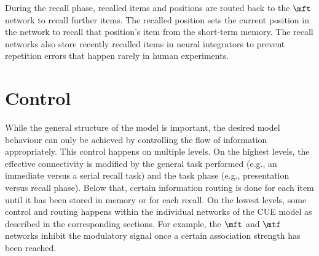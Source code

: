 During the recall phase, recalled items and positions are routed back to the $\mft$ network to recall further items.
The recalled position sets the current position in the  network to recall that position's item from the  short-term memory.
The recall networks also store recently recalled items in neural integrators to prevent repetition errors that happen rarely in human experiments.


\section{Control}\label{sec:control}
While the general structure of the model is important, the desired model behaviour can only be achieved by controlling the flow of information appropriately.
This control happens on multiple levels.
On the highest levels, the effective connectivity is modified by the general task performed (e.g., an immediate versus a serial recall task) and the task phase (e.g., presentation versus recall phase).
Below that, certain information routing is done for each item until it has been stored in memory or for each recall.
On the lowest levels, some control and routing happens within the individual networks of the CUE model as described in the corresponding sections.
For example, the $\mft$ and $\mtf$ networks inhibit the modulatory signal once a certain association strength has been reached.

